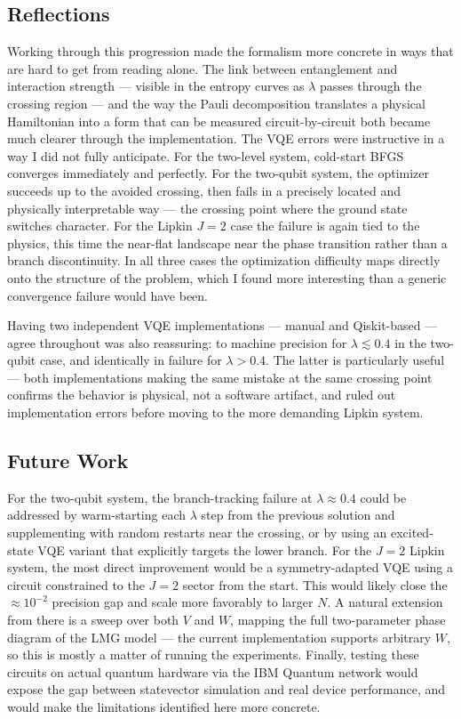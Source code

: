 \subsection{Reflections}
\label{subsec:conclusion-reflections}

Working through this progression made the formalism more concrete in ways that are hard to get from reading alone. The link between entanglement and interaction strength — visible in the entropy curves as $\lambda$ passes through the crossing region — and the way the Pauli decomposition translates a physical Hamiltonian into a form that can be measured circuit-by-circuit both became much clearer through the implementation. The VQE errors were instructive in a way I did not fully anticipate. For the two-level system, cold-start BFGS converges immediately and perfectly. For the two-qubit system, the optimizer succeeds up to the avoided crossing, then fails in a precisely located and physically interpretable way — the crossing point where the ground state switches character. For the Lipkin $J=2$ case the failure is again tied to the physics, this time the near-flat landscape near the phase transition rather than a branch discontinuity. In all three cases the optimization difficulty maps directly onto the structure of the problem, which I found more interesting than a generic convergence failure would have been.

Having two independent VQE implementations — manual and Qiskit-based — agree throughout was also reassuring: to machine precision for $\lambda\lesssim0.4$ in the two-qubit case, and identically in failure for $\lambda>0.4$. The latter is particularly useful — both implementations making the same mistake at the same crossing point confirms the behavior is physical, not a software artifact, and ruled out implementation errors before moving to the more demanding Lipkin system.

\subsection{Future Work}
\label{subsec:conclusion-future-work}

For the two-qubit system, the branch-tracking failure at $\lambda\approx0.4$ could be addressed by warm-starting each $\lambda$ step from the previous solution and supplementing with random restarts near the crossing, or by using an excited-state VQE variant that explicitly targets the lower branch. For the $J=2$ Lipkin system, the most direct improvement would be a symmetry-adapted VQE using a circuit constrained to the $J=2$ sector from the start. This would likely close the $\approx10^{-2}$ precision gap and scale more favorably to larger $N$. A natural extension from there is a sweep over both $V$ and $W$, mapping the full two-parameter phase diagram of the LMG model — the current implementation supports arbitrary $W$, so this is mostly a matter of running the experiments. Finally, testing these circuits on actual quantum hardware via the IBM Quantum network would expose the gap between statevector simulation and real device performance, and would make the limitations identified here more concrete.
